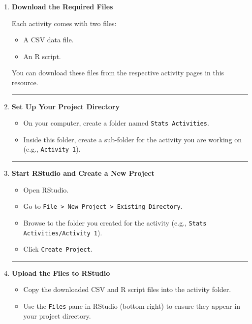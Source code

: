 \documentclass[oneside,openany]{book}
\begin{document}
\begin{enumerate}
    \item \textbf{Download the Required Files}
    
    Each activity comes with two files:
    \begin{itemize}
        \item A CSV data file.
        \item An R script.
    \end{itemize}
    You can download these files from the respective activity pages in this resource.
    
    \begin{center}\rule{0.5\linewidth}{0.5pt}\end{center}

    \item \textbf{Set Up Your Project Directory}
    
    \begin{itemize}
        \item On your computer, create a folder named \texttt{Stats Activities}.
        \item Inside this folder, create a sub-folder for the activity you are working on (e.g., \texttt{Activity 1}).
    \end{itemize}
    
    \begin{center}\rule{0.5\linewidth}{0.5pt}\end{center}

    \item \textbf{Start RStudio and Create a New Project}
    
    \begin{itemize}
        \item Open RStudio.
        \item Go to \texttt{File > New Project > Existing Directory}.
        \item Browse to the folder you created for the activity (e.g., \texttt{Stats Activities/Activity 1}).
        \item Click \texttt{Create Project}.
    \end{itemize}
    
    \begin{center}\rule{0.5\linewidth}{0.5pt}\end{center}

    \item \textbf{Upload the Files to RStudio}
    
    \begin{itemize}
        \item Copy the downloaded CSV and R script files into the activity folder.
        \item Use the \texttt{Files} pane in RStudio (bottom-right) to ensure they appear in your project directory.
    \end{itemize}
    

\end{enumerate}
\end{document}
